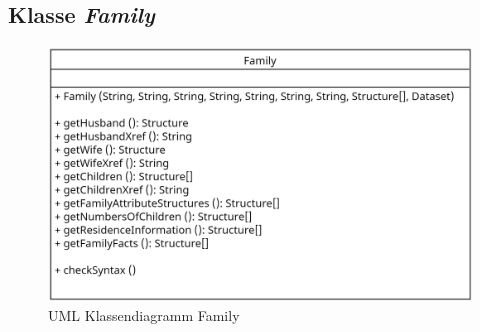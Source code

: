 \subsection{Klasse \textit{Family}}
\label{subsec: Implementierung - Gedcom Struktur - Klasse Family}
\begin{figure}[h]
	\centering
	\includegraphics[width=1\textwidth]{images/UML_Class_Family.png}
	\caption{UML Klassendiagramm Family}
	\label{fig: UML Klassendiagramm Family}
\end{figure}

